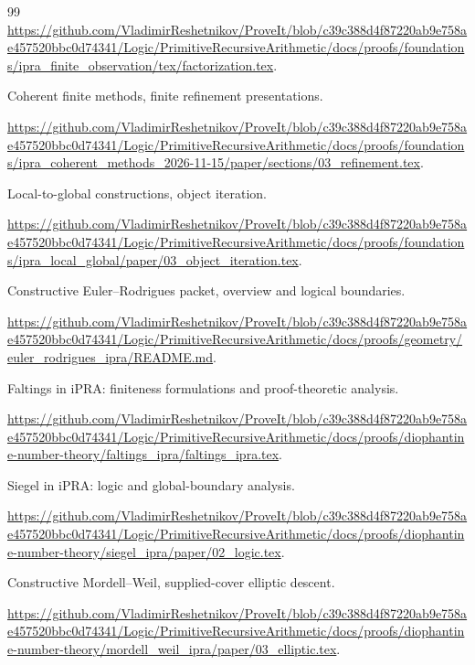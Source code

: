 \begin{thebibliography}{99}
\url{https://github.com/VladimirReshetnikov/ProveIt/blob/c39c388d4f87220ab9e758ae457520bbc0d74341/Logic/PrimitiveRecursiveArithmetic/docs/proofs/foundations/ipra_finite_observation/tex/factorization.tex}.


Coherent finite methods, finite refinement presentations.

\url{https://github.com/VladimirReshetnikov/ProveIt/blob/c39c388d4f87220ab9e758ae457520bbc0d74341/Logic/PrimitiveRecursiveArithmetic/docs/proofs/foundations/ipra_coherent_methods_2026-11-15/paper/sections/03_refinement.tex}.


Local-to-global constructions, object iteration.

\url{https://github.com/VladimirReshetnikov/ProveIt/blob/c39c388d4f87220ab9e758ae457520bbc0d74341/Logic/PrimitiveRecursiveArithmetic/docs/proofs/foundations/ipra_local_global/paper/03_object_iteration.tex}.


Constructive Euler--Rodrigues packet, overview and logical boundaries.

\url{https://github.com/VladimirReshetnikov/ProveIt/blob/c39c388d4f87220ab9e758ae457520bbc0d74341/Logic/PrimitiveRecursiveArithmetic/docs/proofs/geometry/euler_rodrigues_ipra/README.md}.


Faltings in iPRA: finiteness formulations and proof-theoretic analysis.

\url{https://github.com/VladimirReshetnikov/ProveIt/blob/c39c388d4f87220ab9e758ae457520bbc0d74341/Logic/PrimitiveRecursiveArithmetic/docs/proofs/diophantine-number-theory/faltings_ipra/faltings_ipra.tex}.


Siegel in iPRA: logic and global-boundary analysis.

\url{https://github.com/VladimirReshetnikov/ProveIt/blob/c39c388d4f87220ab9e758ae457520bbc0d74341/Logic/PrimitiveRecursiveArithmetic/docs/proofs/diophantine-number-theory/siegel_ipra/paper/02_logic.tex}.


Constructive Mordell--Weil, supplied-cover elliptic descent.

\url{https://github.com/VladimirReshetnikov/ProveIt/blob/c39c388d4f87220ab9e758ae457520bbc0d74341/Logic/PrimitiveRecursiveArithmetic/docs/proofs/diophantine-number-theory/mordell_weil_ipra/paper/03_elliptic.tex}.


\end{thebibliography}
